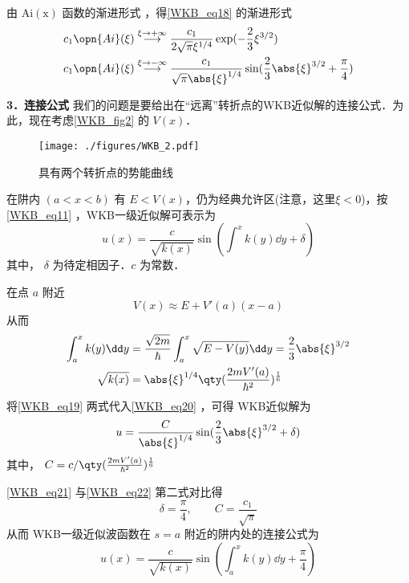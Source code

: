 由 $\mathrm{Ai(x)}$ 函数的渐进形式 ，得\autoref{WKB_eq18} 的渐进形式
\begin{equation}\label{WKB_eq22}
\begin{aligned}
&c_1\opn{Ai}(\xi) \overset{\xi \to +\infty}{\longrightarrow} \frac{c_1}{2\sqrt{\pi} \xi^{1/4}} \exp(-\frac{2}{3}\xi^{3/2})\\
&c_1\opn{Ai}(\xi) \overset{\xi \to -\infty}{\longrightarrow} \frac{c_1}{\sqrt{\pi} \abs{\xi}^{1/4}} \sin(\frac{2}{3}\abs{\xi}^{3/2}+\frac{\pi}{4})\\
\end{aligned}
\end{equation}

\textbf{3．连接公式}
我们的问题是要给出在“远离”转折点的WKB近似解的连接公式．为此，现在考虑\autoref{WKB_fig2} 的 $V(x)$．
\begin{figure}[ht]
\centering
\texttt{[image: ./figures/WKB\_2.pdf]}
\caption{具有两个转折点的势能曲线} \label{WKB_fig2}
\end{figure}
在阱内 $(a<x<b)$ 有 $E<V(x)$，仍为经典允许区(注意，这里$\xi<0$)，按\autoref{WKB_eq11} ，WKB一级近似解可表示为
\begin{equation}\label{WKB_eq20}
u(x)=\frac{c}{\sqrt{k(x)}}\sin(\int^x k(y)\dd y+\delta)
\end{equation}
其中， $\delta$ 为待定相因子．$c$ 为常数．

在点 $a$ 附近
\begin{equation}
V(x)\approx E+V'(a)(x-a)
\end{equation}
从而
\begin{equation}\label{WKB_eq19}
\begin{aligned}
\int_a^xk(y)\dd y&=
\frac{\sqrt{2m}}{\hbar}\int_a^x\sqrt{E-V(y)}\dd y=\frac{2}{3}\abs{\xi}^{3/2}
\\
\sqrt{k(x)}
&=
\abs{\xi}^{1/4}\qty(\frac{2mV'(a)}{\hbar^2})^{\frac{1}{6}}
\end{aligned}
\end{equation}
将\autoref{WKB_eq19} 两式代入\autoref{WKB_eq20} ，可得 WKB近似解为
\begin{equation}\label{WKB_eq21}
u=
\frac{C}{\abs{\xi}^{1/4}}\sin({\frac{2}{3}\abs{\xi}^{3/2}+\delta})
\end{equation}
其中， $C=c/\qty(\frac{2mV'(a)}{\hbar^2})^{\frac{1}{6}}$

\autoref{WKB_eq21} 与\autoref{WKB_eq22} 第二式对比得
\begin{equation}\label{WKB_eq25}
\delta=\frac{\pi}{4},\qquad C=\frac{c_1}{\sqrt{\pi}}
\end{equation}
从而 WKB一级近似波函数在 $s=a$ 附近的阱内处的连接公式为
\begin{equation}
u(x)=\frac{c}{\sqrt{k(x)}}\sin(\int_a^x k(y)\dd y+\frac{\pi}{4})
\end{equation}

